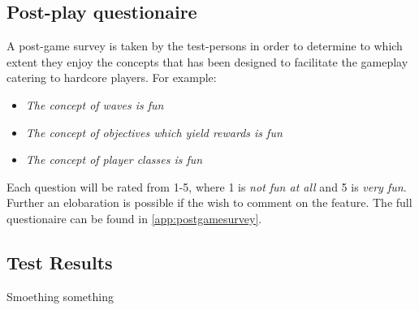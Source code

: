\subsection*{Post-play questionaire}
A post-game survey is taken by the test-persons in order to determine to which extent they enjoy the concepts that has been designed to facilitate the gameplay catering to hardcore players. For example:
\begin{itemize}
\item \emph{The concept of waves is fun}
\item \emph{The concept of objectives which yield rewards is fun}
\item \emph{The concept of player classes is fun}
\end{itemize}

Each question will be rated from 1-5, where 1 is \emph{not fun at all} and 5 is \emph{very fun}. Further an elobaration is possible if the wish to comment on the feature. The full questionaire can be found in \ref{app:postgamesurvey}.


\subsection{Test Results}
Smoething something